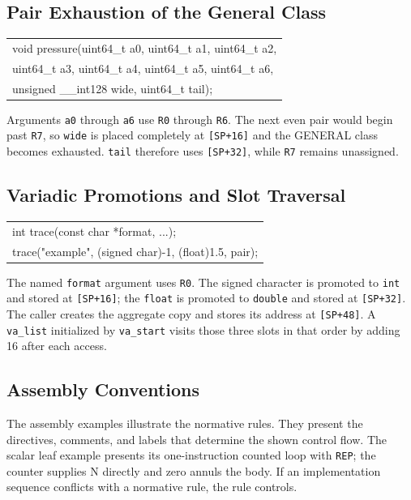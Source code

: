 \documentclass[10pt,twoside]{article}
\begin{document}
\subsection{Pair Exhaustion of the General Class}
\begingroup\small\ttfamily
\begin{tabularx}{\linewidth}{@{}X@{}}
void pressure(uint64\_t a0, uint64\_t a1, uint64\_t a2,\tabularnewline
\hspace{1.2em}uint64\_t a3, uint64\_t a4, uint64\_t a5, uint64\_t a6,\tabularnewline
\hspace{1.2em}unsigned \_\_int128 wide, uint64\_t tail);\tabularnewline
\end{tabularx}
\endgroup
Arguments \texttt{a0} through \texttt{a6} use \texttt{R0} through
\texttt{R6}. The next even pair would begin past \texttt{R7}, so
\texttt{wide} is placed completely at \texttt{[SP+16]} and the GENERAL class
becomes exhausted. \texttt{tail} therefore uses \texttt{[SP+32]}, while
\texttt{R7} remains unassigned.

\subsection{Variadic Promotions and Slot Traversal}
\begingroup\small\ttfamily
\begin{tabularx}{\linewidth}{@{}X@{}}
int trace(const char *format, ...);\tabularnewline
trace("example", (signed char)-1, (float)1.5, pair);\tabularnewline
\end{tabularx}
\endgroup
The named \texttt{format} argument uses \texttt{R0}. The signed character is
promoted to \texttt{int} and stored at \texttt{[SP+16]}; the \texttt{float} is
promoted to \texttt{double} and stored at \texttt{[SP+32]}. The caller creates
the aggregate copy and stores its address at \texttt{[SP+48]}. A
\texttt{va\_list} initialized by \texttt{va\_start} visits those three slots in
that order by adding 16 after each access.

\Needspace{1.8in}
\subsection{Assembly Conventions}
The assembly examples illustrate the normative rules. They present the
directives, comments, and labels that determine the shown control flow. The
scalar leaf example presents its one-instruction counted loop with \texttt{REP}; the counter supplies
N directly and zero annuls the body. If an implementation sequence conflicts with a
normative rule, the rule controls.
\end{document}
